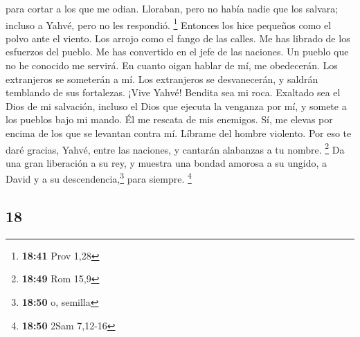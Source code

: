 \begin{paracol}{2}
para cortar a los que me odian.  Lloraban, pero no había
nadie que los salvara; incluso a Yahvé, pero no les respondió.
\footnote{\textbf{18:41} Prov 1,28}  Entonces los hice
pequeños como el polvo ante el viento. Los arrojo como el fango de las
calles.  Me has librado de los esfuerzos del pueblo. Me
has convertido en el jefe de las naciones. Un pueblo que no he conocido
me servirá.  En cuanto oigan hablar de mí, me obedecerán.
Los extranjeros se someterán a mí.  Los extranjeros se
desvanecerán, y saldrán temblando de sus fortalezas. 
¡Vive Yahvé! Bendita sea mi roca. Exaltado sea el Dios de mi salvación,
 incluso el Dios que ejecuta la venganza por mí, y somete
a los pueblos bajo mi mando.  Él me rescata de mis
enemigos. Sí, me elevas por encima de los que se levantan contra mí.
Líbrame del hombre violento.  Por eso te daré gracias,
Yahvé, entre las naciones, y cantarán alabanzas a tu nombre. \footnote{\textbf{18:49}
  Rom 15,9}  Da una gran liberación a su rey, y muestra
una bondad amorosa a su ungido, a David y a su descendencia,\footnote{\textbf{18:50}
  o, semilla} para siempre. \footnote{\textbf{18:50} 2Sam 7,12-16}

\switchcolumn
\begin{otherlanguage}{english}

\hypertarget{section-35}{%
\section{18}\label{section-35}}


\end{otherlanguage}
\end{paracol}

